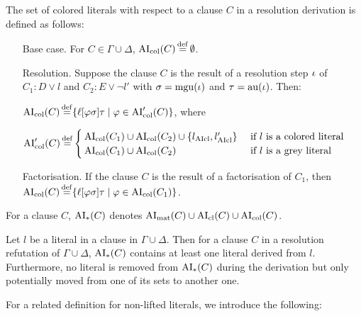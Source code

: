 \documentclass[,%
	draft=false,%
	numbers=noendperiod
	11pt,
	a4paper,
	oneside,%
	openany,
]{memoir}
\begin{document}
\begin{defi}[$\AIcol$]
	The set of colored literals with respect to a clause $C$ in a resolution derivation is defined as follows:

	\begin{itemize}
		\item[Base case.]
			For $C \in \Gamma\cup\Delta$, $\operatorname{AI}_\mathrm{col}(C) \operatorname{\stackrel{\mathrm{def}}{=}} \emptyset$.

		\item[Resolution.]
			Suppose the clause $C$ is the result of a resolution step $\iota$ of $C_1: D \lor l$ and $C_2: E \lor \lnot l'$ with $\sigma = \operatorname{mgu}(\iota)$ and $\tau = \operatorname{au}(\iota)$.
			Then:

			$\operatorname{AI}_\mathrm{col}(C) \operatorname{\stackrel{\mathrm{def}}{=}} \{ \ell[\varphi\sigma]\tau \mid \varphi \in \operatorname{AI}_\mathrm{col}'(C) \}$, where

			$\operatorname{AI}_\mathrm{col}'(C) \operatorname{\stackrel{\mathrm{def}}{=}}
			\begin{cases}
				\operatorname{AI}_\mathrm{col}(C_1) \cup \operatorname{AI}_\mathrm{col}(C_2) \cup \{ l_{\operatorname{AIcl}}, l'_{\operatorname{AIcl}} \}  & \text{ if $l$ is a colored literal} \\
				\operatorname{AI}_\mathrm{col}(C_1) \cup \operatorname{AI}_\mathrm{col}(C_2) & \text{ if $l$ is a grey literal}
			\end{cases} $

		\item[Factorisation.]
			If the clause $C$ is the result of a factorisation of $C_1$, then
			$\operatorname{AI}_\mathrm{col}(C) \operatorname{\stackrel{\mathrm{def}}{=}} \{ \ell[\varphi\sigma]\tau \mid \varphi \in \operatorname{AI}_\mathrm{col}(C_1) \}$.
			\qedhere
	\end{itemize}
\end{defi}

\begin{defi}[$\AIany$]
	For a clause $C$, $\operatorname{AI}_\mathrm{*}(C)$ denotes $\operatorname{AI}_\mathrm{mat}(C) \cup \operatorname{AI}_\mathrm{cl}(C) \cup \operatorname{AI}_\mathrm{col}(C)$.
\end{defi}

\begin{remark}
	Let $l$ be a literal in a clause in $\Gamma \cup \Delta$.
	Then for a clause $C$ in a resolution refutation of $\Gamma\cup\Delta$,
	$\operatorname{AI}_\mathrm{*}(C)$ contains at least one literal derived from $l$.
	Furthermore, no literal is removed from $\operatorname{AI}_\mathrm{*}(C)$ during the derivation but only potentially moved from one of its sets to another one.  
\end{remark}

For a related definition for non-lifted literals, we introduce the following:
\end{document}
